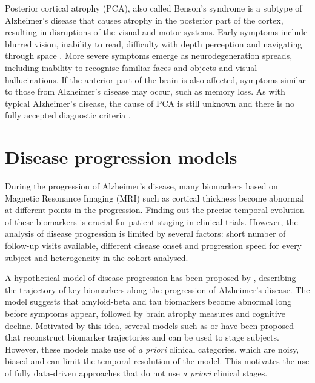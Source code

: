 Posterior cortical atrophy (PCA), also called Benson's syndrome \cite{benson1988posterior} is a subtype of Alzheimer's disease that causes atrophy in the posterior part of the cortex, resulting in disruptions of the visual and motor systems. Early symptoms include blurred vision, inability to read, difficulty with depth perception and navigating through space \cite{crutch2012posterior,borruat2013posterior}. More severe symptoms emerge as neurodegeneration spreads, including inability to recognise familiar faces and objects and visual hallucinations. If the anterior part of the brain is also affected, symptoms similar to those from Alzheimer's disease may occur, such as memory loss.  As with typical Alzheimer's disease, the cause of PCA is still unknown and there is no fully accepted diagnostic criteria \cite{borruat2013posterior}.

\section{Disease progression models}
% 
During the progression of Alzheimer's disease, many biomarkers based on Magnetic Resonance Imaging (MRI) such as cortical thickness become abnormal at different points in the progression. Finding out the precise temporal evolution of these biomarkers is crucial for patient staging in clinical trials. However, the analysis of disease progression is limited by several factors: short number of follow-up visits available, different disease onset and progression speed for every subject and heterogeneity in the cohort analysed. 

A hypothetical model of disease progression has been proposed by \cite{jack2010hypothetical}, describing the trajectory of key biomarkers along the progression of Alzheimer's disease. The model suggests that amyloid-beta and tau biomarkers become abnormal long before symptoms appear, followed by brain atrophy measures and cognitive decline. Motivated by this idea, several models such as \cite{bateman2012clinical} or \cite{schmidt2015multi} have been proposed that reconstruct biomarker trajectories and can be used to stage subjects. However, these models make use of \emph{a priori} clinical categories, which are noisy, biased and can limit the temporal resolution of the model. This motivates the use of fully data-driven approaches that do not use \emph{a priori} clinical stages. 

